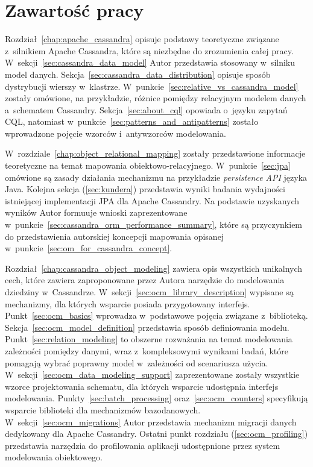 \section{Zawartość pracy}

Rozdział~\ref{chap:apache_cassandra} opisuje podstawy teoretyczne związane z~silnikiem Apache Cassandra, które są niezbędne do zrozumienia całej pracy. W~sekcji~\ref{sec:cassandra_data_model} Autor przedstawia stosowany w~silniku model danych. Sekcja~\ref{sec:cassandra_data_distribution} opisuje sposób dystrybucji wierszy w~klastrze. W~punkcie~\ref{sec:relative_vs_cassandra_model} zostały omówione, na przykładzie, różnice pomiędzy relacyjnym modelem danych a~schematem Cassandry. Sekcja~\ref{sec:about_cql} opowiada o~języku zapytań CQL, natomiast w~punkcie~\ref{sec:patterns_and_antipatterns} zostało wprowadzone pojęcie wzorców i~antywzorców modelowania.

W~rozdziale~\ref{chap:object_relational_mapping} zostały przedstawione informacje teoretyczne na temat mapowania obiektowo-relacyjnego. W~punkcie~\ref{sec:jpa} omówione są zasady działania mechanizmu na przykładzie \emph{persistence API} języka Java. Kolejna sekcja (\ref{sec:kundera}) przedstawia wyniki badania wydajności istniejącej implementacji JPA dla Apache Cassandry. Na podstawie uzyskanych wyników Autor formuuje wnioski zaprezentowane w~punkcie~\ref{sec:cassandra_orm_performance_summary}, które są przyczynkiem do przedstawienia autorskiej koncepcji mapowania opisanej w~punkcie~\ref{sec:om_for_cassandra_concept}.

Rozdział~\ref{chap:cassandra_object_modeling} zawiera opis wszystkich unikalnych cech, które zawiera zaproponowane przez Autora narzędzie do modelowania dziedziny w~Cassandrze. W~sekcji~\ref{sec:ocm_library_description} wypisane są mechanizmy, dla których wsparcie posiada przygotowany interfejs. Punkt~\ref{sec:ocm_basics} wprowadza w~podstawowe pojęcia związane z~biblioteką. Sekcja~\ref{sec:ocm_model_definition} przedstawia sposób definiowania modelu. Punkt~\ref{sec:relation_modeling} to obszerne rozważania na temat modelowania zależności pomiędzy danymi, wraz z~kompleksowymi wynikami badań, które pomagają wybrać poprawny model w~zależności od scenariusza użycia. W~sekcji~\ref{sec:ocm_data_modeling_support} zaprezentowane zostały wszystkie wzorce projektowania schematu, dla których wsparcie udostępnia interfejs modelowania. Punkty~\ref{sec:batch_processing} oraz~\ref{sec:ocm_counters} specyfikują wsparcie biblioteki dla mechanizmów bazodanowych. W~sekcji~\ref{sec:ocm_migrations} Autor przedstawia mechanizm migracji danych dedykowany dla Apache Cassandry. Ostatni punkt rozdziału (\ref{sec:ocm_profiling}) przedstawia narzędzia do profilowania aplikacji udostępnione przez system modelowania obiektowego.